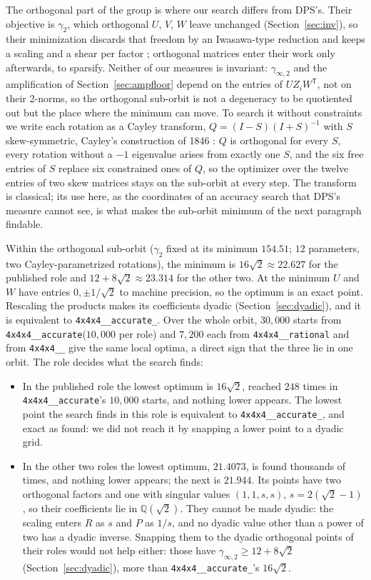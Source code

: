 \documentclass[11pt]{article}
\theoremstyle{remark}
\newcommand{\Q}{\mathbb{Q}}
\newcommand{\ginf}{\gamma_{\infty,2}}
\newcommand{\acc}{\texttt{4x4x4\_\allowbreak 48\_\allowbreak accurate}\xspace}
\newcommand{\acct}{\texttt{4x4x4\_\allowbreak 48\_\allowbreak accurate\_\allowbreak 262}\xspace}
\newcommand{\rat}{\texttt{4x4x4\_\allowbreak 48\_\allowbreak rational}\xspace}
\newcommand{\pto}{\texttt{4x4x4\_\allowbreak 48\_\allowbreak 201}\xspace}
\begin{document}
The orthogonal part of the group is where our search differs from DPS's.
Their objective is $\gamma_2$, which orthogonal $U$, $V$, $W$ leave
unchanged (Section~\ref{sec:inv}), so their minimization discards that
freedom by an Iwasawa-type reduction and keeps a scaling and a shear per
factor \cite{DPS24,DPS26b}; orthogonal matrices enter their work only
afterwards, to sparsify.  Neither of our measures is invariant: $\ginf$ and
the amplification of Section~\ref{sec:ampfloor} depend on the entries of
$UZ_iW^{\mathsf T}$, not on their 2-norms, so the orthogonal sub-orbit is
not a degeneracy to be quotiented out but the place where the minimum can
move.  To search it without constraints we write each rotation as a Cayley
transform, $Q=(I-S)(I+S)^{-1}$ with $S$ skew-symmetric, Cayley's
construction of 1846 \cite{Cayley1846}: $Q$ is orthogonal for every $S$,
every rotation without a $-1$ eigenvalue arises from exactly one $S$, and
the six free entries of $S$ replace six constrained ones of $Q$, so the
optimizer over the twelve entries of two skew matrices stays on the
sub-orbit at every step.  The transform is classical; its use here, as the
coordinates of an accuracy search that DPS's measure cannot see, is what
makes the sub-orbit minimum of the next paragraph findable.

Within the orthogonal sub-orbit ($\gamma_2$ fixed at its minimum
$154.51$; $12$ parameters, two Cayley-parametrized rotations), the
minimum is $16\sqrt2\approx22.627$ for the published role and
$12+8\sqrt2\approx23.314$ for the other two.  At the minimum $U$ and $W$
have entries $0,\pm1/\sqrt2$ to machine precision, so the optimum is an
exact point.  Rescaling the products makes its coefficients dyadic
(Section~\ref{sec:dyadic}), and it is equivalent to \acct.  Over the whole
orbit, $30{,}000$ starts
from \acc ($10{,}000$ per role) and $7{,}200$ each from \rat and from
\pto give the same local optima, a direct sign that
the three lie in one orbit.  The role decides what the search finds:
\begin{itemize}
\item In the published role the lowest optimum is $16\sqrt2$, reached
  $248$ times in \acc's $10{,}000$ starts, and nothing lower appears.
  The lowest point the search finds in this role is equivalent to
  \acct, and exact as found: we did not reach it by snapping a lower
  point to a dyadic grid.
\item In the other two roles the lowest optimum, $21.4073$, is found
  thousands of times, and nothing lower appears; the next is $21.944$.
  Its points have two orthogonal factors and one with singular values
  $(1,1,s,s)$, $s=2(\sqrt2-1)$, so their coefficients lie in
  $\Q(\sqrt2)$.  They cannot be made dyadic: the scaling enters $R$ as
  $s$ and $P$ as $1/s$, and no dyadic value other than a power of two
  has a dyadic inverse.  Snapping them to the dyadic orthogonal points
  of their roles would not help either: those have $\ginf\ge12+8\sqrt2$
  (Section~\ref{sec:dyadic}), more than \acct's $16\sqrt2$.
\end{itemize}
\end{document}
